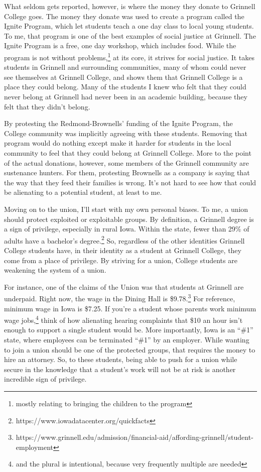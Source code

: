 \documentclass[12pt]{article}[titlepage]
\newcommand{\say}[1]{``\#1''}
\newcommand{\1}{\={a}}
\newcommand{\2}{\={e}}
\newcommand{\3}{\={\i}}
\newcommand{\4}{\=o}
\newcommand{\5}{\=u}
\newcommand{\6}{\={A}}
\renewcommand{\,}{\textsuperscript{,}}
\begin{document}
What seldom gets reported, however, is where the money they donate to Grinnell College goes.
The money they donate was used to create a program called the Ignite Program, which let students teach a one day class to local young students.
To me, that program is one of the best examples of social justice at Grinnell.
The Ignite Program is a free, one day workshop, which includes food.
While the program is not without problems,\footnote{mostly relating to bringing the children to the program} at its core, it strives for social justice.
It takes students in Grinnell and surrounding communities, many of whom could never see themselves at Grinnell College, and shows them that Grinnell College is a place they could belong.
Many of the students I knew who felt that they could never belong at Grinnell had never been in an academic building, because they felt that they didn't belong.

By protesting the Redmond-Brownells' funding of the Ignite Program, the College community was implicitly agreeing with these students.
Removing that program would do nothing except make it harder for students in the local community to feel that they could belong at Grinnell College.
More to the point of the actual donations, however, some members of the Grinnell community are sustenance hunters.
For them, protesting Brownells as a company is saying that the way that they feed their families is wrong.
It's not hard to see how that could be alienating to a potential student, at least to me.

Moving on to the union, I'll start with my own personal biases.
To me, a union should protect exploited or exploitable groups.
By definition, a Grinnell degree is a sign of privilege, especially in rural Iowa.
Within the state, fewer than 29\% of adults have a bachelor's degree.\footnote{https://www.iowadatacenter.org/quickfacts}
So, regardless of the other identities Grinnell College students have, in their identity as a student at Grinnell College, they come from a place of privilege.
By striving for a union, College students are weakening the system of a union.

For instance, one of the claims of the Union was that students at Grinnell are underpaid.
Right now, the wage in the Dining Hall is \$9.78.\footnote{https://www.grinnell.edu/admission/financial-aid/affording-grinnell/student-employment}
For reference, minimum wage in Iowa is \$7.25.
If you're a student whose parents work minimum wage jobs,\footnote{and the plural is intentional, because very frequently multiple are needed} think of how alienating hearing complaints that \$10 an hour isn't enough to support a single student would be.
More importantly, Iowa is an \say{at-will} state, where employees can be terminated \say{at will} by an employer.
While wanting to join a union should be one of the protected groups, that requires the money to hire an attorney.
So, to these students, being able to push for a union while secure in the knowledge that a student's work will not be at risk is another incredible sign of privilege.
\end{document}
